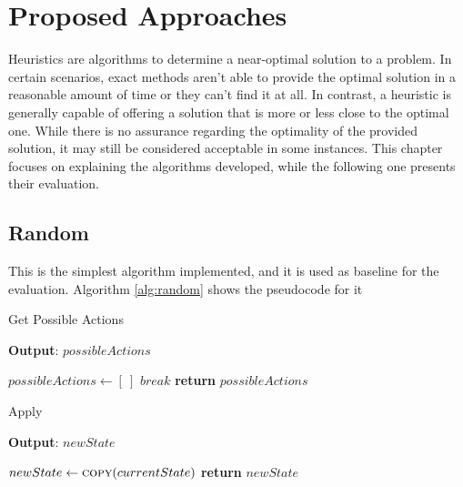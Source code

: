 \chapter{Proposed Approaches}
\label{ch:heuristics}
Heuristics are algorithms to determine a near-optimal solution to a problem. In certain scenarios,
exact methods aren't able to provide the optimal solution in a reasonable amount of time or they can't find it
at all. In contrast, a heuristic is generally capable of offering a solution that is more or less close to
the optimal one.
While there is no assurance regarding the optimality of the provided solution, it may still be considered
acceptable in some instances.
This chapter focuses on explaining the algorithms developed, while the following one presents their evaluation.

\section{Random}
This is the simplest algorithm implemented, and it is used as baseline for the evaluation.
Algorithm \ref{alg:random} shows the pseudocode for it

\begin{algorithm}
	\caption{Get Possible Actions}
	\label{alg:getPossibleActions}
	\hspace*{0.5em} \textbf{Output}: $possibleActions$
	\begin{algorithmic}[1]
		\State $possibleActions \gets [\ ]$
		\State $break$
		\EndIf
		\EndFor
		\State {}
		\EndIf
		\EndFor
		\State \textbf{return} $possibleActions$
		\EndProcedure
	\end{algorithmic}
\end{algorithm}

\begin{algorithm}
	\caption{Apply}
	\label{alg:apply}
	\hspace*{0.5em} \textbf{Output}: $newState$
	\begin{algorithmic}[1]
		\State $newState \gets \Call{copy}{currentState}$
		\State {}
		\EndIf
		\EndFor
		\State \textbf{return} $newState$
		\EndProcedure
	\end{algorithmic}
\end{algorithm}

